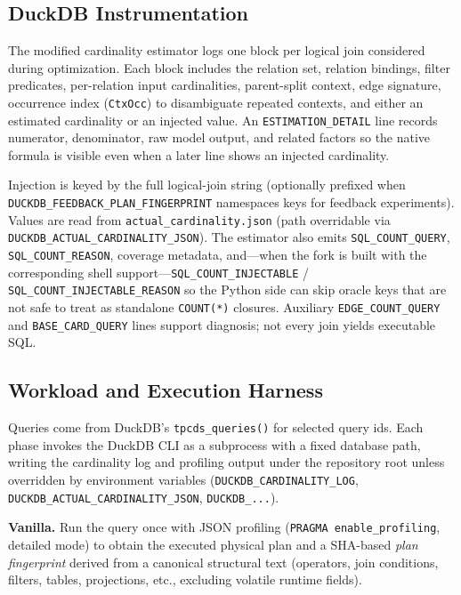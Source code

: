 \documentclass[sigconf,nonacm]{acmart}
\begin{document}
\subsection{DuckDB Instrumentation}

The modified cardinality estimator logs one block per logical join considered during optimization. Each block includes the relation set, relation bindings, filter predicates, per-relation input cardinalities, parent-split context, edge signature, occurrence index (\texttt{CtxOcc}) to disambiguate repeated contexts, and either an estimated cardinality or an injected value. An \texttt{ESTIMATION\_DETAIL} line records numerator, denominator, raw model output, and related factors so the native formula is visible even when a later line shows an injected cardinality.

Injection is keyed by the full logical-join string (optionally prefixed when \texttt{DUCKDB\_FEEDBACK\_PLAN\_FINGERPRINT} namespaces keys for feedback experiments). Values are read from \texttt{actual\_cardinality.json} (path overridable via \texttt{DUCKDB\_ACTUAL\_CARDINALITY\_JSON}). The estimator also emits \texttt{SQL\_COUNT\_QUERY}, \texttt{SQL\_COUNT\_REASON}, coverage metadata, and---when the fork is built with the corresponding shell support---\texttt{SQL\_COUNT\_INJECTABLE} / \texttt{SQL\_COUNT\_INJECTABLE\_REASON} so the Python side can skip oracle keys that are not safe to treat as standalone \texttt{COUNT(*)} closures. Auxiliary \texttt{EDGE\_COUNT\_QUERY} and \texttt{BASE\_CARD\_QUERY} lines support diagnosis; not every join yields executable SQL.

\subsection{Workload and Execution Harness}

Queries come from DuckDB's \texttt{tpcds\_queries()} for selected query ids. Each phase invokes the DuckDB CLI as a subprocess with a fixed database path, writing the cardinality log and profiling output under the repository root unless overridden by environment variables (\texttt{DUCKDB\_CARDINALITY\_LOG}, \texttt{DUCKDB\_ACTUAL\_CARDINALITY\_JSON}, \texttt{DUCKDB\_...}).

\textbf{Vanilla.} Run the query once with JSON profiling (\texttt{PRAGMA enable\_profiling}, detailed mode) to obtain the executed physical plan and a SHA-based \emph{plan fingerprint} derived from a canonical structural text (operators, join conditions, filters, tables, projections, etc., excluding volatile runtime fields).
\end{document}
